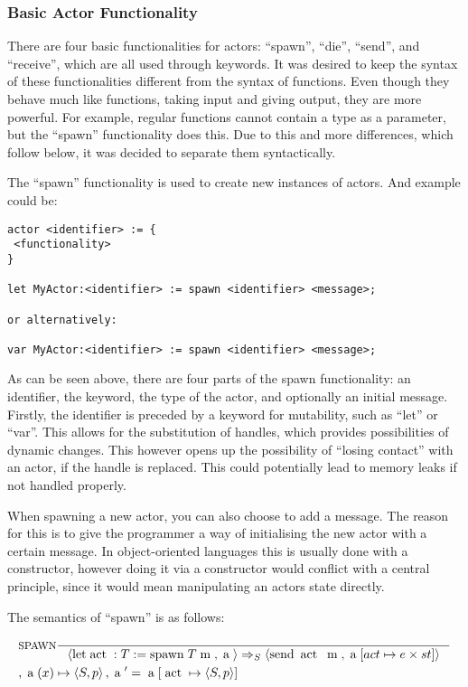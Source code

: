 \subsubsection{Basic Actor Functionality}
\label{subsubsec:BasicActorFunctionality}
There are four basic functionalities for actors: \enquote{spawn}, \enquote{die}, \enquote{send}, and \enquote{receive}, which are all used through keywords. It was desired to keep the syntax of these functionalities different from the syntax of functions. Even though they behave much like functions, taking input and giving output, they are more powerful. For example, regular functions cannot contain a type as a parameter, but the \enquote{spawn} functionality does this. Due to this and more differences, which follow below, it was decided to separate them syntactically.

The \enquote{spawn} functionality is used to create new instances of actors. And example could be:

\label{actorfuncSpawn}
\begin{lstlisting}
actor <identifier> := {
 <functionality>
}

let MyActor:<identifier> := spawn <identifier> <message>;

or alternatively:

var MyActor:<identifier> := spawn <identifier> <message>;
\end{lstlisting}

As can be seen above, there are four parts of the spawn functionality: an identifier, the keyword, the type of the actor, and optionally an initial message. Firstly, the identifier is preceded by a keyword for mutability, such as \enquote{let} or \enquote{var}. This allows for the substitution of handles, which provides possibilities of dynamic changes. This however opens up the possibility of \enquote{losing contact} with an actor, if the handle is replaced. This could potentially lead to memory leaks if not handled properly.

When spawning a new actor, you can also choose to add a message. The reason for this is to give the programmer a way of initialising the new actor with a certain message. In object-oriented languages this is usually done with a constructor, however doing it via a constructor would conflict with a central principle, since it would mean manipulating an actors state directly.

The semantics of \enquote{spawn} is as follows:

\begin{align*}
&\inference[$\text{SPAWN}$]{}
                       {\Braket{\Tlet \Tact:T := \Tspawn \; T \Tm,\Ta} \Rightarrow_S \Braket{\Tsend \Tact \Tm,\Ta[act \mapsto e \times st]}}
\\
&                       {, \Ta(x) \mapsto \Braket{S,p} , \Ta' = \Ta[\Tact \mapsto \Braket{S, p}]}
\end{align*}

